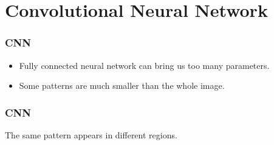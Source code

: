 \documentclass{beamer}
\begin{document}
\section{Convolutional Neural Network}
\begin{frame}
\frametitle{CNN}
\begin{itemize}
	\item Fully connected neural network can bring us too many parameters.
	\item Some patterns are much smaller than the whole image.
\end{itemize}

\begin{figure}
	\hfill
{}
\hfill
{}
\hfill
\end{figure}

\end{frame}


\begin{frame}
	\frametitle{CNN}
The same pattern appears in different regions.
	
	\begin{figure}
		\hfill
		\hfill
		\hfill
	\end{figure}
	
\end{frame}
\end{document}
